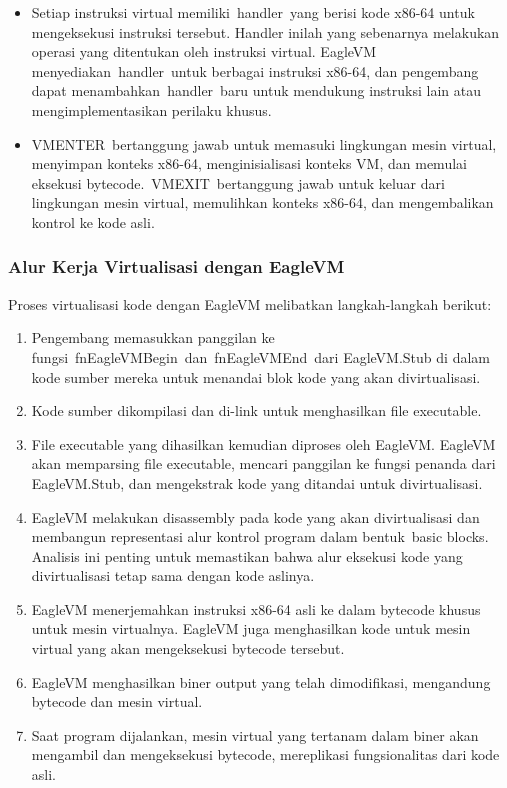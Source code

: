 \begin{itemize}
	\item {} Setiap instruksi virtual memiliki handler yang berisi kode x86-64 untuk mengeksekusi instruksi tersebut. Handler inilah yang sebenarnya melakukan operasi yang ditentukan oleh instruksi virtual. EagleVM menyediakan handler untuk berbagai instruksi x86-64, dan pengembang dapat menambahkan handler baru untuk mendukung instruksi lain atau mengimplementasikan perilaku khusus.
	\item {} VMENTER bertanggung jawab untuk memasuki lingkungan mesin virtual, menyimpan konteks x86-64, menginisialisasi konteks VM, dan memulai eksekusi bytecode. VMEXIT bertanggung jawab untuk keluar dari lingkungan mesin virtual, memulihkan konteks x86-64, dan mengembalikan kontrol ke kode asli.
\end{itemize}

\subsubsection{Alur Kerja Virtualisasi dengan EagleVM}
Proses virtualisasi kode dengan EagleVM melibatkan langkah-langkah berikut:
\begin{enumerate}
	\item {} Pengembang memasukkan panggilan ke fungsi fnEagleVMBegin dan fnEagleVMEnd dari EagleVM.Stub di dalam kode sumber mereka untuk menandai blok kode yang akan divirtualisasi.
	\item {} Kode sumber dikompilasi dan di-link untuk menghasilkan file executable.
	\item {} File executable yang dihasilkan kemudian diproses oleh EagleVM. EagleVM akan memparsing file executable, mencari panggilan ke fungsi penanda dari EagleVM.Stub, dan mengekstrak kode yang ditandai untuk divirtualisasi.
	\item {} EagleVM melakukan disassembly pada kode yang akan divirtualisasi dan membangun representasi alur kontrol program dalam bentuk basic blocks. Analisis ini penting untuk memastikan bahwa alur eksekusi kode yang divirtualisasi tetap sama dengan kode aslinya.
	\item {} EagleVM menerjemahkan instruksi x86-64 asli ke dalam bytecode khusus untuk mesin virtualnya. EagleVM juga menghasilkan kode untuk mesin virtual yang akan mengeksekusi bytecode tersebut.
	\item {} EagleVM menghasilkan biner output yang telah dimodifikasi, mengandung bytecode dan mesin virtual.
	\item {} Saat program dijalankan, mesin virtual yang tertanam dalam biner akan mengambil dan mengeksekusi bytecode, mereplikasi fungsionalitas dari kode asli.
\end{enumerate}
